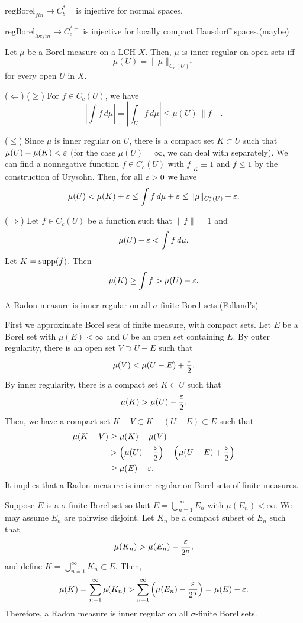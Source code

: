 \documentclass{../../large}
\begin{document}
$\text{regBorel}_{fin}\to C_b^{*+}$ is injective for normal spaces.

$\text{regBorel}_{locfin}\to C_c^{*+}$ is injective for locally compact Hausdorff spaces.(maybe)





\begin{lem}
Let $\mu$ be a Borel measure on a LCH $X$.
Then, $\mu$ is inner regular on open sets iff
\[\mu(U)=\|\mu\|_{C_c(U)^*}\]
for every open $U$ in $X$.
\end{lem}
\begin{pf}
($\Leftarrow$)
($\ge$)
For $f\in C_c(U)$, we have
\[|\int f\,d\mu|=|\int_Uf\,d\mu|\le\mu(U)\,\|f\|.\]

($\le$)
Since $\mu$ is inner regular on $U$, there is a compact set $K\subset U$ such that $\mu(U)-\mu(K)<\varepsilon$ (for the case $\mu(U)=\infty$, we can deal with separately).
We can find a nonnegative function $f\in C_c(U)$ with $f|_K \equiv 1$ and $f\le1$ by the construction of Urysohn.
Then, for all $\varepsilon>0$ we have
\[\mu(U)<\mu(K)+\varepsilon\le\int f\,d\mu+\varepsilon\le\|\mu\|_{C_c^*(U)}+\varepsilon.\]

($\Rightarrow$)
Let $f\in C_c(U)$ be a function such that $\|f\|=1$ and
\[\mu(U)-\varepsilon<\int f\,d\mu.\]
Let $K=\operatorname{supp}(f)$.
Then
\[\mu(K)\ge\int f>\mu(U)-\varepsilon.\]
\end{pf}

\begin{prop}
A Radon measure is inner regular on all $\sigma$-finite Borel sets.(Folland's)
\end{prop}
\begin{pf}
First we approximate Borel sets of finite measure, with compact sets.
Let $E$ be a Borel set with $\mu(E)<\infty$ and $U$ be an open set containing $E$.
By outer regularity, there is an open set $V\supset U-E$ such that
\[\mu(V)<\mu(U-E)+\frac{\varepsilon}2.\]
By inner regularity, there is a compact set $K\subset U$ such that
\[\mu(K)>\mu(U)-\frac{\varepsilon}2.\]
Then, we have a compact set $K-V\subset K-(U-E)\subset E$ such that
\begin{align*}
\mu(K-V)&\ge\mu(K)-\mu(V)\\
&>\left(\mu(U)-\frac{\varepsilon}2\right)-\left(\mu(U-E)+\frac{\varepsilon}2\right)\\
&\ge\mu(E)-\varepsilon.
\end{align*}
It implies that a Radon measure is inner regular on Borel sets of finite measures.

Suppose $E$ is a $\sigma$-finite Borel set so that $E=\bigcup_{n=1}^\infty E_n$ with $\mu(E_n)<\infty$.
We may assume $E_n$ are pairwise disjoint.
Let $K_n$ be a compact subset of $E_n$ such that
\[\mu(K_n)>\mu(E_n)-\frac{\varepsilon}{2^n},\]
and define $K=\bigcup_{n=1}^\infty K_n\subset E$.
Then,
\[\mu(K)=\sum_{n=1}^\infty\mu(K_n)>\sum_{n=1}^\infty\left(\mu(E_n)-\frac{\varepsilon}{2^n}\right)=\mu(E)-\varepsilon.\]
Therefore, a Radon measure is inner regular on all $\sigma$-finite Borel sets.
\end{pf}
\end{document}
